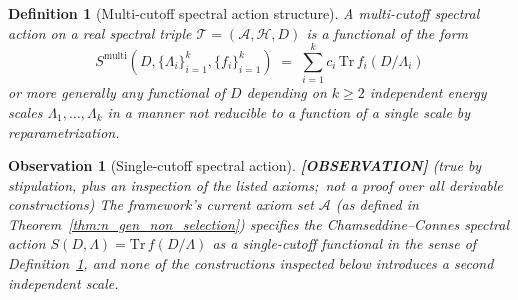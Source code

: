 \documentclass[11pt]{article}
\newtheorem{observation}{Observation}
\newtheorem{definition}{Definition}
\begin{document}
\begin{definition}[Multi-cutoff spectral action structure]
\label{def:multi_cutoff}
A multi-cutoff spectral action on a real spectral triple
$\mathcal{T} = (\mathcal{A}, \mathcal{H}, D)$ is a functional of the
form
\[
  S^{\mathrm{multi}}(D, \{\Lambda_i\}_{i=1}^k, \{f_i\}_{i=1}^k)
  \;=\; \sum_{i=1}^{k} c_i \, \mathrm{Tr}\, f_i(D/\Lambda_i)
\]
or more generally any functional of $D$ depending on $k \ge 2$
independent energy scales $\Lambda_1, \ldots, \Lambda_k$ in a manner
not reducible to a function of a single scale by reparametrization.
\end{definition}

\begin{observation}[Single-cutoff spectral action]
\label{thm:single_cutoff_spectral_action}
\textbf{[OBSERVATION]} (true by stipulation, plus an inspection of the
listed axioms;\ not a proof over all derivable constructions)
The framework's current axiom set $\mathcal{A}$ (as defined in
\emph{Theorem~\ref{thm:n_gen_non_selection}}) specifies the
Chamseddine--Connes spectral action $S(D, \Lambda) = \mathrm{Tr}\,
f(D/\Lambda)$ as a single-cutoff functional in the sense of
\emph{Definition~\ref{def:multi_cutoff}}, and none of the constructions
inspected below introduces a second independent scale.
\end{observation}
\end{document}
